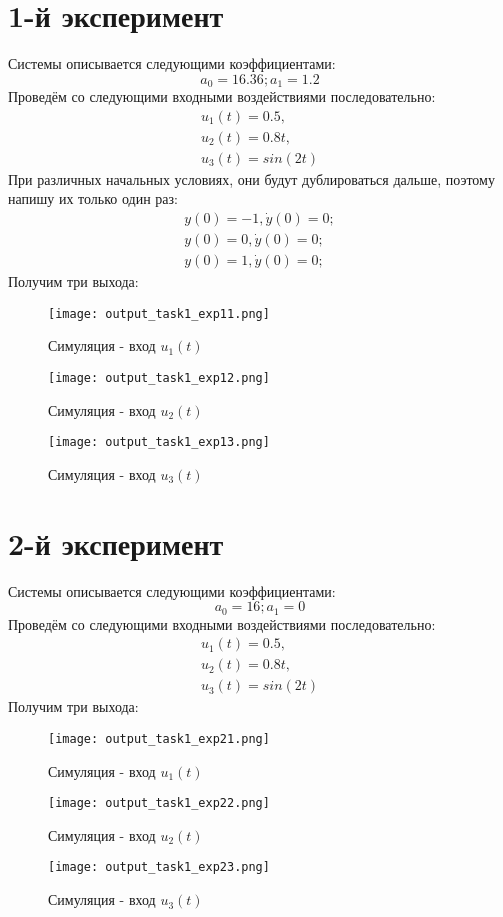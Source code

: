 \section{1-й эксперимент}
Системы описывается следующими коэффициентами:
$$
a_0 = 16.36; a_1 = 1.2
$$
Проведём со следующими входными воздействиями последовательно:
$$
\begin{aligned}
    u_1(t) = 0.5, \\
    u_2(t) = 0.8t, \\
    u_3(t) = sin(2t) 
\end{aligned}
$$
При различных начальных условиях, они будут дублироваться дальше, поэтому напишу их только один раз:
$$
\begin{aligned}
    y(0) = -1, \dot{y}(0)=0; \\
    y(0) = 0, \dot{y}(0)=0; \\
    y(0) = 1, \dot{y}(0)=0; 
\end{aligned}
$$
Получим три выхода:
\begin{figure}[ht]
    \centering
    \texttt{[image: output\_task1\_exp11.png]}
  \caption{Симуляция - вход $u_1(t)$}
\end{figure}
\begin{figure}[ht]
    \centering
    \texttt{[image: output\_task1\_exp12.png]}
  \caption{Симуляция - вход $u_2(t)$}
\end{figure}
\begin{figure}[ht]
    \centering
    \texttt{[image: output\_task1\_exp13.png]}
  \caption{Симуляция - вход $u_3(t)$}
\end{figure}

\newpage
\section{2-й эксперимент}
Системы описывается следующими коэффициентами:
$$
a_0 = 16; a_1 = 0
$$
Проведём со следующими входными воздействиями последовательно:
$$
\begin{aligned}
    u_1(t) = 0.5, \\
    u_2(t) = 0.8t, \\
    u_3(t) = sin(2t) 
\end{aligned}
$$
Получим три выхода:
\begin{figure}[ht]
    \centering
    \texttt{[image: output\_task1\_exp21.png]}
  \caption{Симуляция - вход $u_1(t)$}
\end{figure}
\begin{figure}[ht]
    \centering
    \texttt{[image: output\_task1\_exp22.png]}
  \caption{Симуляция - вход $u_2(t)$}
\end{figure}
\begin{figure}[ht]
    \centering
    \texttt{[image: output\_task1\_exp23.png]}
  \caption{Симуляция - вход $u_3(t)$}
\end{figure}

